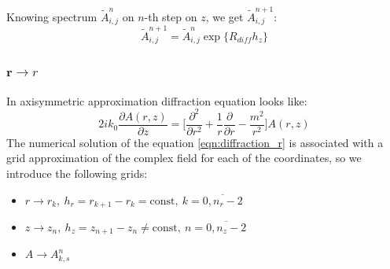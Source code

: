 \documentclass[a4paper, 12pt]{article}
\begin{document}
Knowing spectrum $\tilde{A}^n_{i,j}$ on $n$-th step on $z$, we get $\tilde{A}^{n+1}_{i,j}$:
\begin{equation}
\tilde{A}^{n+1}_{i,j} = \tilde{A}^n_{i,j} \exp\{R_{diff} h_z \}
\end{equation}

\subsubsection{$\mathbf{r}\longrightarrow r$}
In axisymmetric approximation diffraction equation looks like:
\begin{equation}
\label{eqn:diffraction_r}
2 i k_0 \frac{\partial A (r, z)}{\partial z} = \biggl[ \frac{\partial^2}{\partial r^2} + \frac1{r}\frac{\partial}{\partial r} - \frac{m^2}{r^2} \biggr] A(r,z)
\end{equation}
The numerical solution of the equation \eqref{eqn:diffraction_r} is associated with a grid approximation of the complex field for each of the coordinates, so we introduce the following grids:
\begin{itemize}
\item $r\longrightarrow r_k, \ h_r = r_{k+1} - r_{k} = \text{const}, \ k = \overline{0, n_r-2}$
\item $z\longrightarrow z_n, \ h_z = z_{n+1} - z_{n} \ne \text{const}, \ n = \overline{0, n_z-2}$
\item $A \longrightarrow A^n_{k, s}$
\end{itemize}
\end{document}
